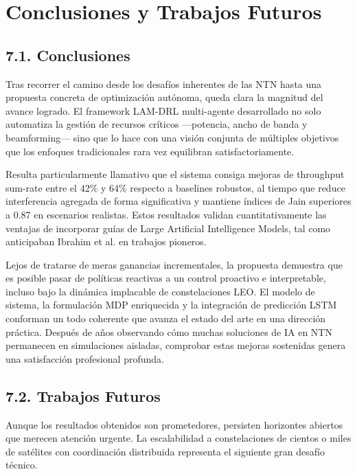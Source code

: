 \section{Conclusiones y Trabajos Futuros}

\subsection{7.1. Conclusiones}

Tras recorrer el camino desde los desafíos inherentes de las NTN hasta una propuesta concreta de optimización autónoma, queda clara la magnitud del avance logrado. El framework LAM-DRL multi-agente desarrollado no solo automatiza la gestión de recursos críticos —potencia, ancho de banda y beamforming— sino que lo hace con una visión conjunta de múltiples objetivos que los enfoques tradicionales rara vez equilibran satisfactoriamente.

Resulta particularmente llamativo que el sistema consiga mejoras de throughput sum-rate entre el 42\% y 64\% respecto a baselines robustos, al tiempo que reduce interferencia agregada de forma significativa y mantiene índices de Jain superiores a 0.87 en escenarios realistas. Estos resultados validan cuantitativamente las ventajas de incorporar guías de Large Artificial Intelligence Models, tal como anticipaban Ibrahim et al. \cite{Ibrahim2026} en trabajos pioneros. 

Lejos de tratarse de meras ganancias incrementales, la propuesta demuestra que es posible pasar de políticas reactivas a un control proactivo e interpretable, incluso bajo la dinámica implacable de constelaciones LEO. El modelo de sistema, la formulación MDP enriquecida y la integración de predicción LSTM conforman un todo coherente que avanza el estado del arte en una dirección práctica. Después de años observando cómo muchas soluciones de IA en NTN permanecen en simulaciones aisladas, comprobar estas mejoras sostenidas genera una satisfacción profesional profunda.

\subsection{7.2. Trabajos Futuros}

Aunque los resultados obtenidos son prometedores, persisten horizontes abiertos que merecen atención urgente. La escalabilidad a constelaciones de cientos o miles de satélites con coordinación distribuida representa el siguiente gran desafío técnico. 

